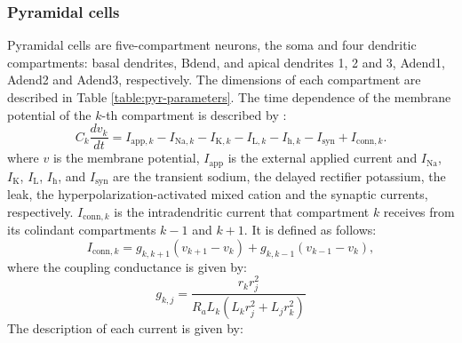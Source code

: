 \documentclass[../main.tex]{subfiles}
\begin{document}
\subsubsection{Pyramidal cells}
Pyramidal cells are five-compartment neurons, the soma and four dendritic compartments: basal dendrites, Bdend, and apical dendrites 1, 2 and 3, Adend1, Adend2 and Adend3, respectively.
The dimensions of each compartment are described in Table \ref{table:pyr-parameters}.
The time dependence of the membrane potential of the $k$-th compartment is described by \citep{neymotin_ketamine_2011,neymotin_ih_2013,Tort2007,}:
\begin{equation}
    C_k\displaystyle\frac{dv_k}{dt} = I_{\text{app},k}-I_{\text{Na},k} - I_{\text{K},k} - I_{\text{L},k} -I_{\text{h},k} -I_{\text{syn}} + I_{\text{conn},k}.
    \label{eq:pyr-dynamics}
\end{equation}
where $v$ is the membrane potential, $I_{\text{app}}$ is the external applied current and $I_\text{Na}$, $I_{\text{K}}$, $I_{\text{L}}$, $I_{\text{h}}$,  and $I_{\text{syn}}$ are the transient sodium, the delayed rectifier potassium, the leak, the hyperpolarization-activated mixed cation and the synaptic currents, respectively. 
$I_{\text{conn},k}$ is the intradendritic current that compartment $k$ receives from its colindant compartments $k-1$ and $k+1$.
It is defined as follows:
\begin{equation}
    I_{\text{conn},k} = g_{k,k+1}(v_{k+1}-v_k) + g_{k,k-1}(v_{k-1}-v_k),
    \label{eq:dendritic-current}
\end{equation}
where the coupling conductance is given by:
\begin{equation}
    g_{k,j} = \displaystyle\frac{r_k r_j^2}{R_aL_k(L_kr_j^2 + L_jr_k^2)}
    \label{eq:dendritic-coupling}
\end{equation}
The description of each current is given by:
\end{document}
